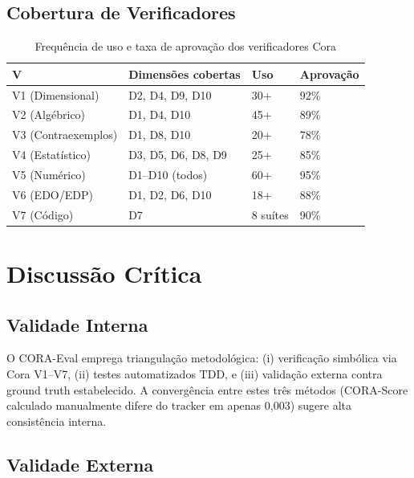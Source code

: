 \documentclass[12pt,a4paper,oneside]{article}
\begin{document}
\subsection{Cobertura de Verificadores}

\begin{table}[H]
\centering
\caption{Frequência de uso e taxa de aprovação dos verificadores Cora}
\label{tab:verifiercov}
\begin{tabular}{p{}p{}p{}p{}}
\toprule
\textbf{V} & \textbf{Dimensões cobertas} & \textbf{Uso} & \textbf{Aprovação} \\
\midrule
V1 (Dimensional) & D2, D4, D9, D10 & 30+ & 92\% \\
V2 (Algébrico) & D1, D4, D10 & 45+ & 89\% \\
V3 (Contraexemplos) & D1, D8, D10 & 20+ & 78\% \\
V4 (Estatístico) & D3, D5, D6, D8, D9 & 25+ & 85\% \\
V5 (Numérico) & D1--D10 (todos) & 60+ & 95\% \\
V6 (EDO/EDP) & D1, D2, D6, D10 & 18+ & 88\% \\
V7 (Código) & D7 & 8 suítes & 90\% \\
\bottomrule
\end{tabular}
\end{table}

\section{Discussão Crítica}

\subsection{Validade Interna}

O CORA-Eval emprega triangulação metodológica: (i) verificação simbólica via
Cora V1--V7, (ii) testes automatizados TDD, e (iii) validação externa contra
ground truth estabelecido. A convergência entre estes três métodos (CORA-Score
calculado manualmente difere do tracker em apenas 0,003) sugere alta
consistência interna.

\subsection{Validade Externa}
\end{document}

